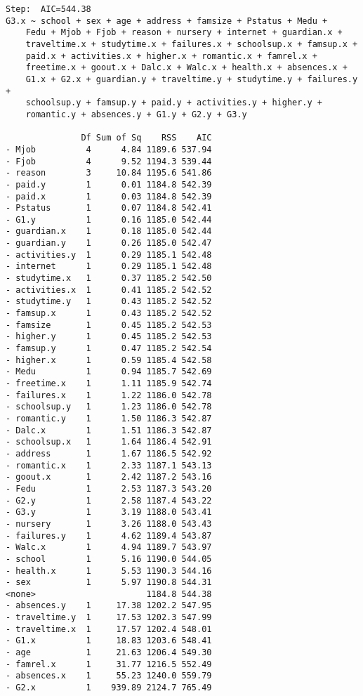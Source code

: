 \documentclass[11pt]{article}
\begin{document}
\begin{enumerate}
\begin{verbatim}
Step:  AIC=544.38
G3.x ~ school + sex + age + address + famsize + Pstatus + Medu + 
    Fedu + Mjob + Fjob + reason + nursery + internet + guardian.x + 
    traveltime.x + studytime.x + failures.x + schoolsup.x + famsup.x + 
    paid.x + activities.x + higher.x + romantic.x + famrel.x + 
    freetime.x + goout.x + Dalc.x + Walc.x + health.x + absences.x + 
    G1.x + G2.x + guardian.y + traveltime.y + studytime.y + failures.y + 
    schoolsup.y + famsup.y + paid.y + activities.y + higher.y + 
    romantic.y + absences.y + G1.y + G2.y + G3.y

               Df Sum of Sq    RSS    AIC
- Mjob          4      4.84 1189.6 537.94
- Fjob          4      9.52 1194.3 539.44
- reason        3     10.84 1195.6 541.86
- paid.y        1      0.01 1184.8 542.39
- paid.x        1      0.03 1184.8 542.39
- Pstatus       1      0.07 1184.8 542.41
- G1.y          1      0.16 1185.0 542.44
- guardian.x    1      0.18 1185.0 542.44
- guardian.y    1      0.26 1185.0 542.47
- activities.y  1      0.29 1185.1 542.48
- internet      1      0.29 1185.1 542.48
- studytime.x   1      0.37 1185.2 542.50
- activities.x  1      0.41 1185.2 542.52
- studytime.y   1      0.43 1185.2 542.52
- famsup.x      1      0.43 1185.2 542.52
- famsize       1      0.45 1185.2 542.53
- higher.y      1      0.45 1185.2 542.53
- famsup.y      1      0.47 1185.2 542.54
- higher.x      1      0.59 1185.4 542.58
- Medu          1      0.94 1185.7 542.69
- freetime.x    1      1.11 1185.9 542.74
- failures.x    1      1.22 1186.0 542.78
- schoolsup.y   1      1.23 1186.0 542.78
- romantic.y    1      1.50 1186.3 542.87
- Dalc.x        1      1.51 1186.3 542.87
- schoolsup.x   1      1.64 1186.4 542.91
- address       1      1.67 1186.5 542.92
- romantic.x    1      2.33 1187.1 543.13
- goout.x       1      2.42 1187.2 543.16
- Fedu          1      2.53 1187.3 543.20
- G2.y          1      2.58 1187.4 543.22
- G3.y          1      3.19 1188.0 543.41
- nursery       1      3.26 1188.0 543.43
- failures.y    1      4.62 1189.4 543.87
- Walc.x        1      4.94 1189.7 543.97
- school        1      5.16 1190.0 544.05
- health.x      1      5.53 1190.3 544.16
- sex           1      5.97 1190.8 544.31
<none>                      1184.8 544.38
- absences.y    1     17.38 1202.2 547.95
- traveltime.y  1     17.53 1202.3 547.99
- traveltime.x  1     17.57 1202.4 548.01
- G1.x          1     18.83 1203.6 548.41
- age           1     21.63 1206.4 549.30
- famrel.x      1     31.77 1216.5 552.49
- absences.x    1     55.23 1240.0 559.79
- G2.x          1    939.89 2124.7 765.49


\end{verbatim}
\end{enumerate}
\end{document}
